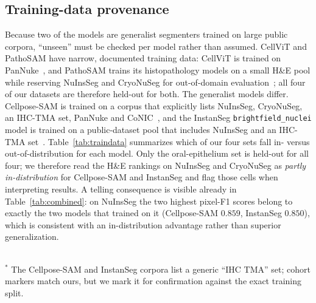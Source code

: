 \documentclass[10pt,conference]{IEEEtran}
\begin{document}
\subsection{Training-data provenance}
\label{sec:provenance}
Because two of the models are generalist segmenters trained on large public
corpora, ``unseen'' must be checked per model rather than assumed. CellViT and
PathoSAM have narrow, documented training data: CellViT is trained on
PanNuke~\cite{cellvit}, and PathoSAM trains its histopathology models on a small
H\&E pool while reserving NuInsSeg and CryoNuSeg for out-of-domain
evaluation~\cite{microsam}; all four of our datasets are therefore held-out for
both. The generalist models differ. Cellpose-SAM is trained on a corpus that
explicitly lists NuInsSeg, CryoNuSeg, an IHC-TMA set, PanNuke and
CoNIC~\cite{cellposesam}, and the InstanSeg \texttt{brightfield\_nuclei} model is
trained on a public-dataset pool that includes NuInsSeg and an IHC-TMA
set~\cite{instanseg}. Table~\ref{tab:traindata} summarizes which of our four sets
fall in- versus out-of-distribution for each model. Only the oral-epithelium set
is held-out for all four; we therefore read the H\&E rankings on NuInsSeg and
CryoNuSeg as \emph{partly in-distribution} for Cellpose-SAM and InstanSeg and flag
those cells when interpreting results. A telling consequence is visible already in
Table~\ref{tab:combined}: on NuInsSeg the two highest pixel-F1 scores belong to
exactly the two models that trained on it (Cellpose-SAM $0.859$, InstanSeg
$0.850$), which is consistent with an in-distribution advantage rather than
superior generalization.

\begin{table}[t]
\centering
\caption{Training-data provenance of our four evaluation sets per model.
\emph{in} = the set is part of that model's training corpus
(in-distribution); \emph{held} = held-out. Only the oral set is held-out for all
four models.}
\label{tab:traindata}
\footnotesize
{}
\\[2pt]
\footnotesize $^{*}$ The Cellpose-SAM and InstanSeg corpora list a generic
``IHC TMA'' set; cohort markers match ours, but we mark it for confirmation
against the exact training split.
\end{table}
\end{document}
